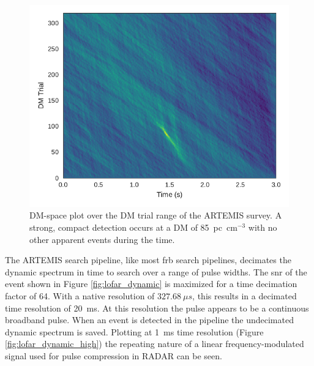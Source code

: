 \documentclass[a4paper,fleqn,usenatbib]{mnras}
\begin{document}
\begin{figure}
    \includegraphics[width=1.0\linewidth]{figures/LOFAR_dm_time.pdf}
    \caption{DM-space plot over the DM trial range of the ARTEMIS survey. A
    strong, compact detection occurs at a DM of 85~pc~cm$^{-3}$ with no other
    apparent events during the time.
    }
    \label{fig:lofar_dm_time}
\end{figure}

The ARTEMIS search pipeline, like most \gls{frb} search pipelines, decimates the
dynamic spectrum in time to search over a range of pulse widths. The \gls{snr}
of the event shown in Figure \ref{fig:lofar_dynamic} is maximized for a time
decimation factor of 64. With a native resolution of $327.68~\mu s$, this
results in a decimated time resolution of 20~ms. At this resolution the pulse
appears to be a continuous broadband pulse. When an event is detected in the
pipeline the undecimated dynamic spectrum is saved. Plotting at 1~ms time
resolution (Figure \ref{fig:lofar_dynamic_high}) the repeating nature of a
linear frequency-modulated signal used for pulse compression in RADAR can be
seen.
\end{document}
